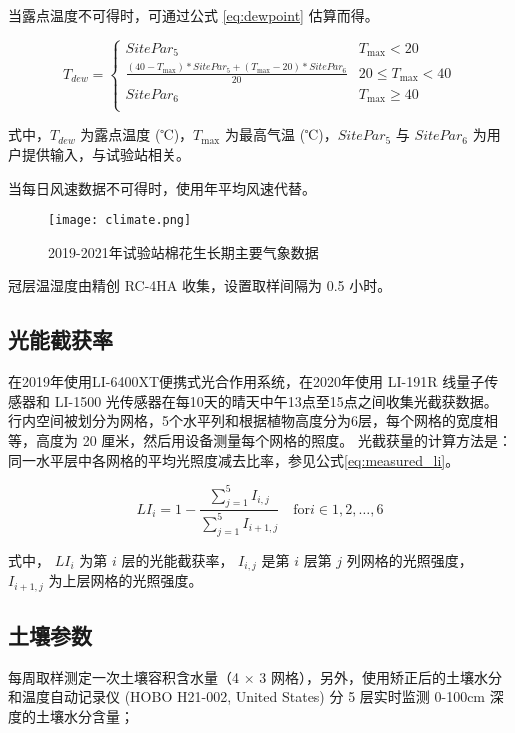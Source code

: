当露点温度不可得时，可通过公式 \ref{eq:dewpoint} 估算而得。

\begin{equation}\label{eq:dewpoint}
    T_{dew} = \begin{cases}
        SitePar_5                                                            & T_{\max} < 20        \\
        \frac{(40 - T_{\max}) * SitePar_5 + (T_{\max} - 20) * SitePar_6}{20} & 20 \le T_{\max} < 40 \\
        SitePar_6                                                            & T_{\max} \ge 40      \\
    \end{cases}
\end{equation}

式中，$T_{dew}$ 为露点温度 (℃)，$T_{\max}$ 为最高气温 (℃)，$SitePar_5$ 与 $SitePar_6$ 为用户提供输入，与试验站相关。

当每日风速数据不可得时，使用年平均风速代替。

\begin{figure}
    \centering
    \texttt{[image: climate.png]}
    \caption{2019-2021年试验站棉花生长期主要气象数据}
\end{figure}

冠层温湿度由精创 RC-4HA 收集，设置取样间隔为 0.5 小时。

\subsection{光能截获率}

在2019年使用LI-6400XT便携式光合作用系统，在2020年使用 LI-191R 线量子传感器和 LI-1500 光传感器在每10天的晴天中午13点至15点之间收集光截获数据。
行内空间被划分为网格，5个水平列和根据植物高度分为6层，每个网格的宽度相等，高度为 20 厘米，然后用设备测量每个网格的照度。
光截获量的计算方法是：同一水平层中各网格的平均光照度减去比率，参见公式\ref{eq:measured_li}。

\begin{equation}\label{eq:measured_li}
    LI_{i} = 1 - \frac{\sum^5_{j=1} I_{i,j}}{\sum^5_{j=1} I_{i+1,j}} \quad \mathrm{for} i \in {1,2,\dots,6}
\end{equation}

式中， $LI_{i}$ 为第 $i$ 层的光能截获率， $I_{i,j}$ 是第 $i$ 层第 $j$ 列网格的光照强度， $I_{i+1,j}$ 为上层网格的光照强度。

\subsection{土壤参数}
每周取样测定一次土壤容积含水量（4 $\times$ 3 网格），另外，使用矫正后的土壤水分和温度自动记录仪 (HOBO H21-002, United States) 分 5 层实时监测 0-100cm 深度的土壤水分含量；

